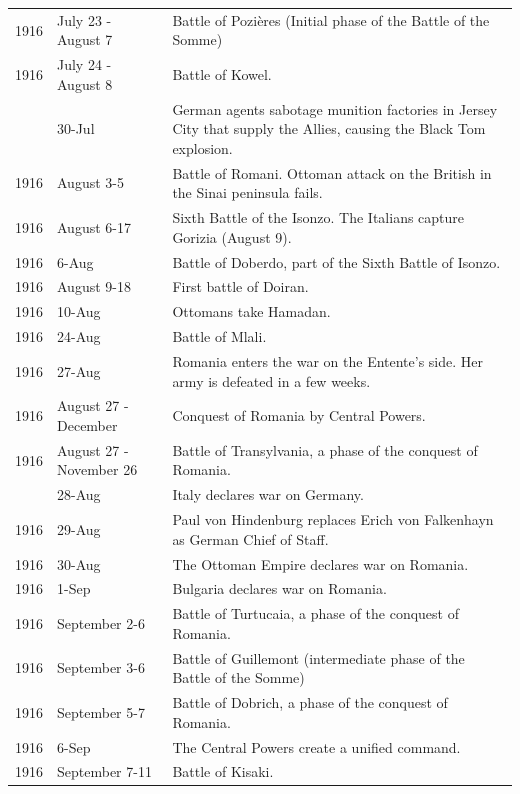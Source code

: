 \documentclass[
  openany]{book}
\begin{document}
\begin{longtable}[t]{rl>{\raggedright\arraybackslash}p{22em}}
1916 & July 23 - August 7 & Battle of Pozières (Initial phase of the Battle of the Somme)\\
\rowcolor{gray!6}  1916 & July 24 - August 8 & Battle of Kowel.\\
\addlinespace
1916 & 30-Jul & German agents sabotage munition factories in Jersey City that supply the Allies, causing the Black Tom explosion.\\
\rowcolor{gray!6}  1916 & August 3-5 & Battle of Romani. Ottoman attack on the British in the Sinai peninsula fails.\\
1916 & August 6-17 & Sixth Battle of the Isonzo. The Italians capture Gorizia (August 9).\\
\rowcolor{gray!6}  1916 & 6-Aug & Battle of Doberdo, part of the Sixth Battle of Isonzo.\\
1916 & August 9-18 & First battle of Doiran.\\
\addlinespace
\rowcolor{gray!6}  1916 & 10-Aug & Ottomans take Hamadan.\\
1916 & 24-Aug & Battle of Mlali.\\
\rowcolor{gray!6}  1916 & 27-Aug & Romania enters the war on the Entente's side. Her army is defeated in a few weeks.\\
1916 & August 27 - December & Conquest of Romania by Central Powers.\\
\rowcolor{gray!6}  1916 & August 27 - November 26 & Battle of Transylvania, a phase of the conquest of Romania.\\
\addlinespace
1916 & 28-Aug & Italy declares war on Germany.\\
\rowcolor{gray!6}  1916 & 29-Aug & Paul von Hindenburg replaces Erich von Falkenhayn as German Chief of Staff.\\
1916 & 30-Aug & The Ottoman Empire declares war on Romania.\\
\rowcolor{gray!6}  1916 & 1-Sep & Bulgaria declares war on Romania.\\
1916 & September 2-6 & Battle of Turtucaia, a phase of the conquest of Romania.\\
\addlinespace
\rowcolor{gray!6}  1916 & September 3-6 & Battle of Guillemont (intermediate phase of the Battle of the Somme)\\
1916 & September 5-7 & Battle of Dobrich, a phase of the conquest of Romania.\\
\rowcolor{gray!6}  1916 & 6-Sep & The Central Powers create a unified command.\\
1916 & September 7-11 & Battle of Kisaki.\\

\end{longtable}
\end{document}
